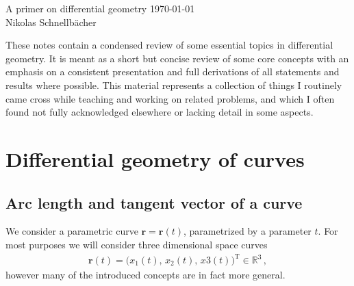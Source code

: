 \documentclass[11pt, DINA4, fleqn]{amsart}
\def\vr{\boldsymbol{r}\xspace}
\begin{document}
\begin{flushleft}
{\sc \LARGE A primer on differential geometry} \hfill \today \\
\medskip
\Large
Nikolas Schnellbächer \underline{\hspace{6.53in}} \\
\end{flushleft}

These notes contain a condensed review of some essential topics in differential geometry. It is meant as a short but concise review of some core concepts with an emphasis on a consistent presentation and full derivations of all statements and results where possible. This material represents a collection of things I routinely came cross while teaching and working on related problems, and which I often found not fully acknowledged elsewhere or lacking detail in some aspects.

\section{Differential geometry of curves}
\subsection{Arc length and tangent vector of a curve}

We consider a parametric curve $\vr = \vr(t)$, parametrized by a parameter $t$.
For most purposes we will consider three dimensional space curves
\begin{align}
\vr(t) = \bigl(x_1(t),\, x_2(t),\, x3(t)\bigl)^{\text{T}}\in \mathbb{R}^3 \, ,
\end{align}
however many of the introduced concepts are in fact more general.
\end{document}
